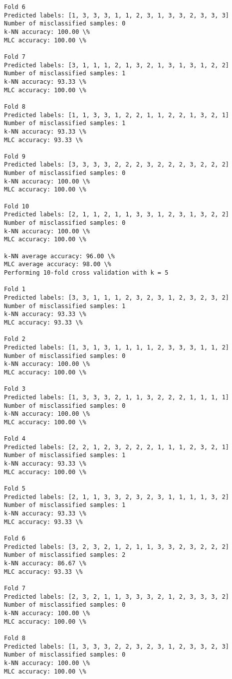 \documentclass[11pt]{article}
\begin{document}
\begin{Verbatim}[commandchars=\\\{\}]
Fold 6
Predicted labels: [1, 3, 3, 3, 1, 1, 2, 3, 1, 3, 3, 2, 3, 3, 3]
Number of misclassified samples: 0
k-NN accuracy: 100.00 \%
MLC accuracy: 100.00 \%

Fold 7
Predicted labels: [3, 1, 1, 1, 2, 1, 3, 2, 1, 3, 1, 3, 1, 2, 2]
Number of misclassified samples: 1
k-NN accuracy: 93.33 \%
MLC accuracy: 100.00 \%

Fold 8
Predicted labels: [1, 1, 3, 3, 1, 2, 2, 1, 1, 2, 2, 1, 3, 2, 1]
Number of misclassified samples: 1
k-NN accuracy: 93.33 \%
MLC accuracy: 93.33 \%

Fold 9
Predicted labels: [3, 3, 3, 3, 2, 2, 2, 3, 2, 2, 2, 3, 2, 2, 2]
Number of misclassified samples: 0
k-NN accuracy: 100.00 \%
MLC accuracy: 100.00 \%

Fold 10
Predicted labels: [2, 1, 1, 2, 1, 1, 3, 3, 1, 2, 3, 1, 3, 2, 2]
Number of misclassified samples: 0
k-NN accuracy: 100.00 \%
MLC accuracy: 100.00 \%

k-NN average accuracy: 96.00 \%
MLC average accuracy: 98.00 \%
Performing 10-fold cross validation with k = 5

Fold 1
Predicted labels: [3, 3, 1, 1, 1, 2, 3, 2, 3, 1, 2, 3, 2, 3, 2]
Number of misclassified samples: 1
k-NN accuracy: 93.33 \%
MLC accuracy: 93.33 \%

Fold 2
Predicted labels: [1, 3, 1, 3, 1, 1, 1, 1, 2, 3, 3, 3, 1, 1, 2]
Number of misclassified samples: 0
k-NN accuracy: 100.00 \%
MLC accuracy: 100.00 \%

Fold 3
Predicted labels: [1, 3, 3, 3, 2, 1, 1, 3, 2, 2, 2, 1, 1, 1, 1]
Number of misclassified samples: 0
k-NN accuracy: 100.00 \%
MLC accuracy: 100.00 \%

Fold 4
Predicted labels: [2, 2, 1, 2, 3, 2, 2, 2, 1, 1, 1, 2, 3, 2, 1]
Number of misclassified samples: 1
k-NN accuracy: 93.33 \%
MLC accuracy: 100.00 \%

Fold 5
Predicted labels: [2, 1, 1, 3, 3, 2, 3, 2, 3, 1, 1, 1, 1, 3, 2]
Number of misclassified samples: 1
k-NN accuracy: 93.33 \%
MLC accuracy: 93.33 \%

Fold 6
Predicted labels: [3, 2, 3, 2, 1, 2, 1, 1, 3, 3, 2, 3, 2, 2, 2]
Number of misclassified samples: 2
k-NN accuracy: 86.67 \%
MLC accuracy: 93.33 \%

Fold 7
Predicted labels: [2, 3, 2, 1, 1, 3, 3, 3, 2, 1, 2, 3, 3, 3, 2]
Number of misclassified samples: 0
k-NN accuracy: 100.00 \%
MLC accuracy: 100.00 \%

Fold 8
Predicted labels: [1, 3, 3, 3, 2, 2, 3, 2, 3, 1, 2, 3, 3, 2, 3]
Number of misclassified samples: 0
k-NN accuracy: 100.00 \%
MLC accuracy: 100.00 \%


\end{Verbatim}
\end{document}
